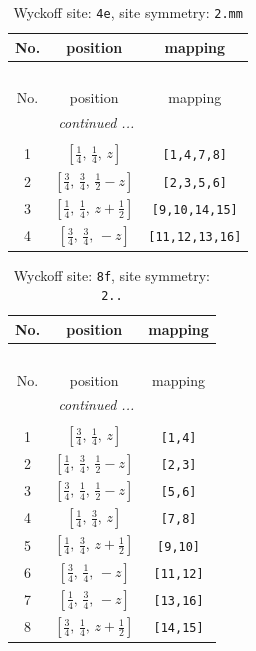 \documentclass[fleqn,8pt]{jsarticle}
\begin{document}
\renewcommand{\arraystretch}{1.2}
\begin{longtable}{ccc}
\caption{Wyckoff site: {\tt 4e}, site symmetry: {\tt 2.mm}}
 \\
 \hline \hline
No. & position & mapping \\ \hline \endfirsthead

\multicolumn{2}{l}{\tablename\ \thetable{}} \\
 \hline \hline
No. & position & mapping \\ \hline \endhead

 \hline \hline
\multicolumn{2}{r}{\footnotesize\it continued ...} \\ \endfoot

 \hline \hline
\multicolumn{2}{r}{} \\ \endlastfoot

1 & $\left[ \frac{1}{4},\, \frac{1}{4},\, z \right]$ & {\tt [1,4,7,8]} \\ \hline
2 & $\left[ \frac{3}{4},\, \frac{3}{4},\, \frac{1}{2} - z \right]$ & {\tt [2,3,5,6]} \\ \hline
3 & $\left[ \frac{1}{4},\, \frac{1}{4},\, z + \frac{1}{2} \right]$ & {\tt [9,10,14,15]} \\ \hline
4 & $\left[ \frac{3}{4},\, \frac{3}{4},\, - z \right]$ & {\tt [11,12,13,16]} \\
\end{longtable}
\renewcommand{\arraystretch}{1.2}
\begin{longtable}{ccc}
\caption{Wyckoff site: {\tt 8f}, site symmetry: {\tt 2..}}
 \\
 \hline \hline
No. & position & mapping \\ \hline \endfirsthead

\multicolumn{2}{l}{\tablename\ \thetable{}} \\
 \hline \hline
No. & position & mapping \\ \hline \endhead

 \hline \hline
\multicolumn{2}{r}{\footnotesize\it continued ...} \\ \endfoot

 \hline \hline
\multicolumn{2}{r}{} \\ \endlastfoot

1 & $\left[ \frac{3}{4},\, \frac{1}{4},\, z \right]$ & {\tt [1,4]} \\ \hline
2 & $\left[ \frac{1}{4},\, \frac{3}{4},\, \frac{1}{2} - z \right]$ & {\tt [2,3]} \\ \hline
3 & $\left[ \frac{3}{4},\, \frac{1}{4},\, \frac{1}{2} - z \right]$ & {\tt [5,6]} \\ \hline
4 & $\left[ \frac{1}{4},\, \frac{3}{4},\, z \right]$ & {\tt [7,8]} \\ \hline
5 & $\left[ \frac{1}{4},\, \frac{3}{4},\, z + \frac{1}{2} \right]$ & {\tt [9,10]} \\ \hline
6 & $\left[ \frac{3}{4},\, \frac{1}{4},\, - z \right]$ & {\tt [11,12]} \\ \hline
7 & $\left[ \frac{1}{4},\, \frac{3}{4},\, - z \right]$ & {\tt [13,16]} \\ \hline
8 & $\left[ \frac{3}{4},\, \frac{1}{4},\, z + \frac{1}{2} \right]$ & {\tt [14,15]} \\
\end{longtable}
\end{document}
